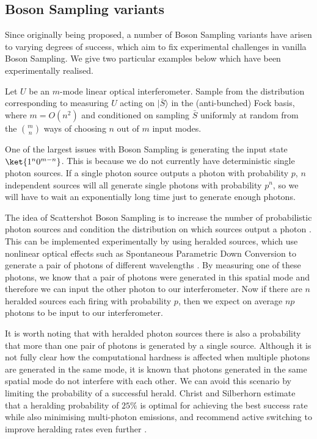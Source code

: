 \subsection{Boson Sampling variants}
\label{ssec:bs-variants}

Since originally being proposed, a number of Boson Sampling variants have arisen to varying degrees of success, which aim to fix experimental challenges in vanilla Boson Sampling. We give two particular examples below which have been experimentally realised.

\begin{problem} Let $U$ be an $m$-mode linear optical interferometer. Sample from the distribution corresponding to measuring $U$ acting on $|\bar{S}\rangle$ in the (anti-bunched) Fock basis, where $m=O(n^2)$ and conditioned on sampling $\bar{S}$ uniformly at random from the $\binom{m}{n}$ ways of choosing $n$ out of $m$ input modes.
\end{problem}

One of the largest issues with Boson Sampling is generating the input state $\ket{1^n0^{m-n}}$. This is because we do not currently have deterministic single photon sources. If a single photon source outputs a photon with probability $p$, $n$ independent sources will all generate single photons with probability $p^n$, so we will have to wait an exponentially long time just to generate enough photons.

The idea of Scattershot Boson Sampling is to increase the number of probabilistic photon sources and condition the distribution on which sources output a photon \cite{aaronson2013, lund2014}. This can be implemented experimentally by using heralded sources, which use nonlinear optical effects such as Spontaneous Parametric Down Conversion to generate a pair of photons of different wavelengths \cite{loudon2006}. By measuring one of these photons, we know that a pair of photons were generated in this spatial mode and therefore we can input the other photon to our interferometer. Now if there are $n$ heralded sources each firing with probability $p$, then we expect on average $np$ photons to be input to our interferometer.

It is worth noting that with heralded photon sources there is also a probability that more than one pair of photons is generated by a single source. Although it is not fully clear how the computational hardness is affected when multiple photons are generated in the same mode, it is known that photons generated in the same spatial mode do not interfere with each other. We can avoid this scenario by limiting the probability of a successful herald. Christ and Silberhorn estimate that a heralding probability of $25\%$ is optimal for achieving the best success rate while also minimising multi-photon emissions, and recommend active switching to improve heralding rates even further \cite{christ2012}.

